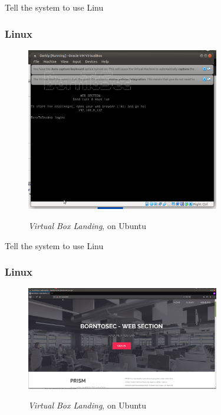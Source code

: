 Tell the system to use Linu
\subsubsection{Linux}

\begin{figure}[!htb]
    \centering
    \includegraphics[width=0.752\textwidth]{images/00-13.png}\\[0cm]  
    \caption[Virtual Box]{\emph{Virtual Box Landing}, on Ubuntu}
    \label{fig:00-13 - Linux Virtual Box Landing} 
\end{figure}

Tell the system to use Linu
\subsubsection{Linux}

\begin{figure}[!htb]
    \centering
    \includegraphics[width=0.752\textwidth]{images/00-14.png}\\[0cm]  
    \caption[Virtual Box]{\emph{Virtual Box Landing}, on Ubuntu}
    \label{fig:00-14 - Linux Virtual Box Landing} 
\end{figure}

